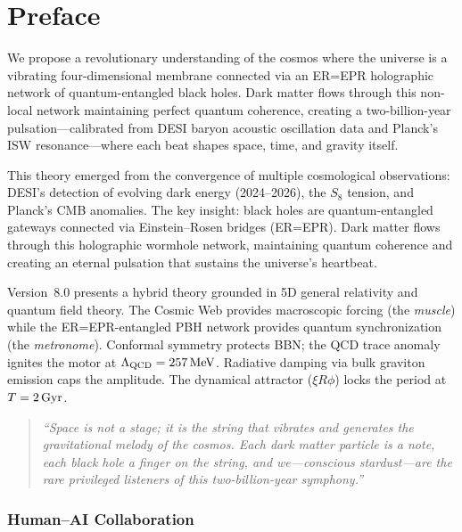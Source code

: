 
\chapter*{Preface}

We propose a revolutionary understanding of the cosmos where the universe is a vibrating four-dimensional membrane connected via an ER=EPR holographic network of quantum-entangled black holes. Dark matter flows through this non-local network maintaining perfect quantum coherence, creating a two-billion-year pulsation---calibrated from DESI baryon acoustic oscillation data and Planck's ISW resonance---where each beat shapes space, time, and gravity itself.

This theory emerged from the convergence of multiple cosmological observations: DESI's detection of evolving dark energy (2024--2026), the $S_8$ tension, and Planck's CMB anomalies. The key insight: black holes are quantum-entangled gateways connected via Einstein--Rosen bridges (ER=EPR). Dark matter flows through this holographic wormhole network, maintaining quantum coherence and creating an eternal pulsation that sustains the universe's heartbeat.

Version~8.0 presents a hybrid theory grounded in 5D general relativity and quantum field theory. The Cosmic Web provides macroscopic forcing (the \emph{muscle}) while the ER=EPR-entangled PBH network provides quantum synchronization (the \emph{metronome}). Conformal symmetry protects BBN; the QCD trace anomaly ignites the motor at $\Lambda_\text{QCD} = 257\,\text{MeV}$. Radiative damping via bulk graviton emission caps the amplitude. The dynamical attractor ($\xi R\phi$) locks the period at $T = 2\,\text{Gyr}$.

\bigskip

\begin{quote}
\textit{``Space is not a stage; it is the string that vibrates and generates the gravitational melody of the cosmos. Each dark matter particle is a note, each black hole a finger on the string, and we---conscious stardust---are the rare privileged listeners of this two-billion-year symphony.''}
\end{quote}

\subsection*{Human--AI Collaboration}

